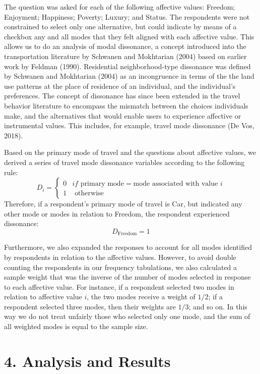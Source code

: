 \documentclass[]{elsarticle} %
\begin{document}
The question was asked for each of the following affective values:
Freedom; Enjoyment; Happiness; Poverty; Luxury; and Status. The
respondents were not constrained to select only one alternative, but
could indicate by means of a checkbox any and all modes that they felt
aligned with each affective value. This allows us to do an analysis of
modal dissonance, a concept introduced into the transportation
literature by Schwanen and Mokhtarian (2004) based on earlier work by
Feldman (1990). Residential neighborhood-type dissonance was defined by
Schwanen and Mokhtarian (2004) as an incongruence in terms of the the
land use patterns at the place of residence of an individual, and the
individual's preferences. The concept of dissonance has since been
extended in the travel behavior literature to encompass the mismatch
between the choices individuals make, and the alternatives that would
enable users to experience affective or instrumental values. This
includes, for example, travel mode dissonance (De Vos, 2018).

Based on the primary mode of travel and the questions about affective
values, we derived a series of travel mode dissonance variables
according to the following rule: \[
D_i = 
\begin{cases}
0 & if \text{ primary mode} = \text{mode associated with value } i\\
1 & \text{ otherwise}
\end{cases}
\] Therefore, if a respondent's primary mode of travel is Car, but
indicated any other mode or modes in relation to Freedom, the respondent
experienced dissonance: \[
D_{\text{Freedom}} = 1
\]

Furthermore, we also expanded the responses to account for all modes
identified by respondents in relation to the affective values. However,
to avoid double counting the respondents in our frequency tabulations,
we also calculated a sample weight that was the inverse of the number of
modes selected in response to each affective value. For instance, if a
respondent selected two modes in relation to affective value \(i\), the
two modes receive a weight of \(1/2\); if a respondent selected three
modes, then their weights are \(1/3\); and so on. In this way we do not
treat unfairly those who selected only one mode, and the sum of all
weighted modes is equal to the sample size.

\hypertarget{analysis-and-results}{%
\section{4. Analysis and Results}\label{analysis-and-results}}
\end{document}
